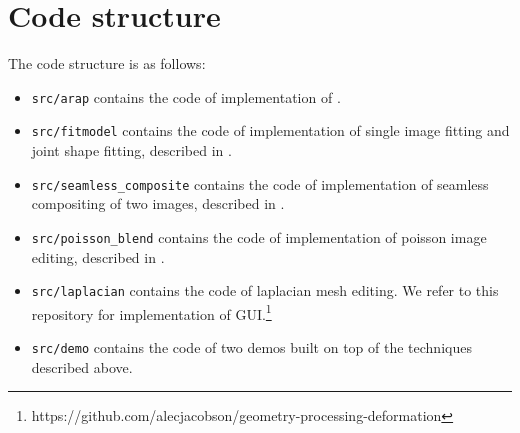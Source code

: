 \section{Code structure}
The code structure is as follows:
\begin{itemize}
\item \texttt{src/arap} contains the code of implementation of \cite{igarashi2005rigid}.
\item \texttt{src/fitmodel} contains the code of implementation of single image fitting and joint shape fitting, described in \cite{yang2011expression}.
\item \texttt{src/seamless\_composite} contains the code of implementation of seamless compositing of two images, described in \cite{agarwala2004interactive}.
\item \texttt{src/poisson\_blend} contains the code of implementation of poisson image editing, described in \cite{perez2003poisson}.
\item \texttt{src/laplacian} contains the code of laplacian mesh editing\cite{sorkine2004laplacian}. We refer to this repository for implementation of GUI.\footnote{https://github.com/alecjacobson/geometry-processing-deformation} 
\item \texttt{src/demo} contains the code of two demos built on top of the techniques described above.
\end{itemize}